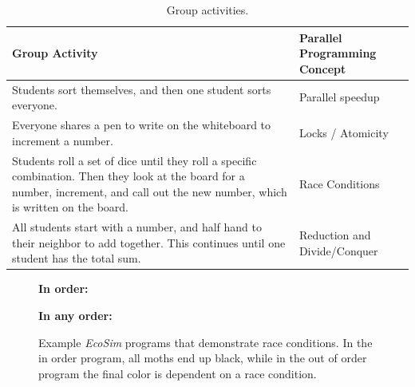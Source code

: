 \documentclass{sig-alternate}
\newcommand{\INDSTATE}[1][1]{\STATE\hspace{#1\algorithmicindent}}
\begin{document}
\begin{table}
\centering \begin{tabular}{p{11cm} | p{5cm}} 
\toprule
Group Activity               &  Parallel Programming Concept \\ \midrule
Students sort themselves, and then one student sorts everyone.     & Parallel speedup \\ \hline
Everyone shares a pen to write on the whiteboard to increment a number. & Locks / Atomicity  \\ \hline
Students roll a set of dice until they roll a specific combination.  Then they
look at the board for a number, increment, and call out the new number, which is
written on the board.  & Race Conditions \\ \hline
All students start with a number, and half hand to their neighbor to add together.
This continues until one student has the total sum. & Reduction and Divide/Conquer  \\
\bottomrule 
\end{tabular}
\caption{Group activities.}
\label{tab:group-activities}
\end{table} 
     
\begin{figure}
\begin{algorithmic}[1]
\item[{\bf In order:}]
  \INDSTATE{a position}
  \INDSTATE{a color}
\STATE{}
  \INDSTATE{do in order}
  \INDSTATE[2]{replace the moth's color with gray}
  \INDSTATE[2]{replace the moth's color with black}
\end{algorithmic}

\begin{algorithmic}[1]
\item[{\bf In any order:}]
  \INDSTATE{a position}
  \INDSTATE{a color}
\STATE{}
  \INDSTATE{do in any order}
  \INDSTATE[2]{replace the moth's color with gray}
  \INDSTATE[2]{replace the moth's color with black}
\end{algorithmic} 
\caption{Example \emph{EcoSim} programs that demonstrate race conditions.  In the
in order program, all moths end up black, while in the out of order program
the final color is dependent on a race condition.}
\label{fig:race-conditions} 
\end{figure}
\end{document}
